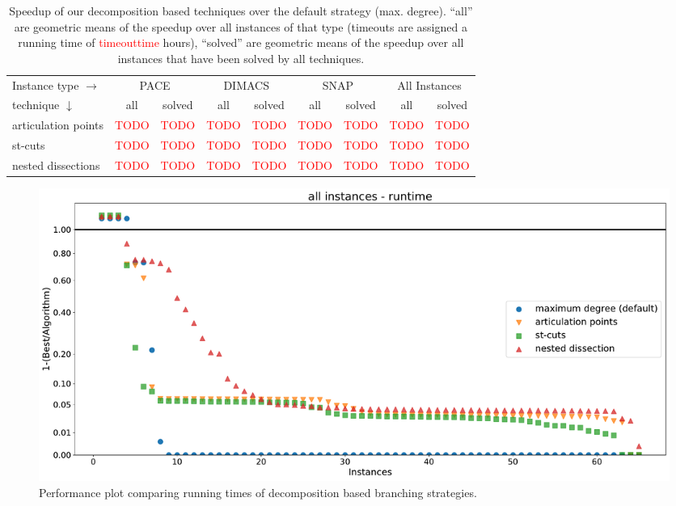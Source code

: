 \documentclass[a4paper,UKenglish,cleveref, autoref, thm-restate]{lipics-v2021}
\begin{document}
\begin{table}[t]
  \caption{Speedup of our decomposition based techniques over the default
    strategy (max. degree). ``all'' are geometric means of the speedup over all
  instances of that type (timeouts are assigned a running time of
  \textcolor{red}{timeouttime} hours), ``solved'' are geometric means of the
  speedup over all instances that have been solved by all techniques.}
\label{tab:summary_decomp}

  \centering
  \begin{tabular}{|l|rr|rr|rr|rr|}
    \hline
    Instance type $\rightarrow$ & \multicolumn{2}{c|}{PACE} & \multicolumn{2}{c|}{DIMACS} & \multicolumn{2}{c|}{SNAP} & \multicolumn{2}{c|}{All Instances}                                                                                                          \\
    technique $\downarrow$      & \multicolumn{1}{c}{all}   & \multicolumn{1}{c|}{solved} & \multicolumn{1}{c}{all}   & \multicolumn{1}{c|}{solved} & \multicolumn{1}{c}{all} & \multicolumn{1}{c|}{solved} & \multicolumn{1}{c}{all} & \multicolumn{1}{c|}{solved} \\
    \hline
    articulation points         & \textcolor{red}{TODO}     & \textcolor{red}{TODO}       & \textcolor{red}{TODO}     & \textcolor{red}{TODO}       & \textcolor{red}{TODO}   & \textcolor{red}{TODO}       & \textcolor{red}{TODO}   & \textcolor{red}{TODO}       \\
    st-cuts                     & \textcolor{red}{TODO}     & \textcolor{red}{TODO}       & \textcolor{red}{TODO}     & \textcolor{red}{TODO}       & \textcolor{red}{TODO}   & \textcolor{red}{TODO}       & \textcolor{red}{TODO}   & \textcolor{red}{TODO}       \\
    nested dissections          & \textcolor{red}{TODO}     & \textcolor{red}{TODO}       & \textcolor{red}{TODO}     & \textcolor{red}{TODO}       & \textcolor{red}{TODO}   & \textcolor{red}{TODO}       & \textcolor{red}{TODO}   & \textcolor{red}{TODO}       \\
    \hline
    \end{tabular}
\end{table}

\begin{figure}[t]
\includegraphics[width=\textwidth]{plots/all_decomposition_based_time}
\caption{Performance plot comparing running times of decomposition based branching strategies.}
\label{fig:all_decomp_time}
\end{figure}
\end{document}

